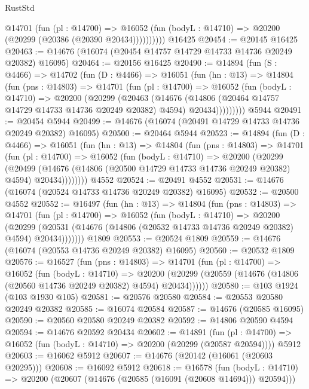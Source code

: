 \begin{lexlean}{RustStd}
\begin{coremodule}
            @14701
              (fun (pl : @14700) =>
              @16052 (fun (bodyL : @14710) => @20200 (@20299 (@20386 (@20390 @20434))))))))))
    @16425
@20454 := @20145 @16425
@20463 := @14676 (@16074 (@20454 @14757 @14729 @14733 @14736 @20249 @20382) @16095)
@20464 := @20156 @16425
@20490 := @14894
    (fun (S : @4466) =>
    @14702
      (fun (D : @4466) =>
      @16051
        (fun (hn : @13) =>
        @14804
          (fun (pns : @14803) =>
          @14701
            (fun (pl : @14700) =>
            @16052
              (fun (bodyL : @14710) =>
              @20200
                (@20299
                  (@20463
                    (@14676
                      (@14806 (@20464 @14757 @14729 @14733 @14736 @20249 @20382) @4594)
                      @20434)))))))))
    @5944
@20491 := @20454 @5944
@20499 := @14676 (@16074 (@20491 @14729 @14733 @14736 @20249 @20382) @16095)
@20500 := @20464 @5944
@20523 := @14894
    (fun (D : @4466) =>
    @16051
      (fun (hn : @13) =>
      @14804
        (fun (pns : @14803) =>
        @14701
          (fun (pl : @14700) =>
          @16052
            (fun (bodyL : @14710) =>
            @20200
              (@20299
                (@20499
                  (@14676 (@14806 (@20500 @14729 @14733 @14736 @20249 @20382) @4594) @20434))))))))
    @4552
@20524 := @20491 @4552
@20531 := @14676 (@16074 (@20524 @14733 @14736 @20249 @20382) @16095)
@20532 := @20500 @4552
@20552 := @16497
    (fun (hn : @13) =>
    @14804
      (fun (pns : @14803) =>
      @14701
        (fun (pl : @14700) =>
        @16052
          (fun (bodyL : @14710) =>
          @20200
            (@20299
              (@20531 (@14676 (@14806 (@20532 @14733 @14736 @20249 @20382) @4594) @20434)))))))
    @1809
@20553 := @20524 @1809
@20559 := @14676 (@16074 (@20553 @14736 @20249 @20382) @16095)
@20560 := @20532 @1809
@20576 := @16527
    (fun (pns : @14803) =>
    @14701
      (fun (pl : @14700) =>
      @16052
        (fun (bodyL : @14710) =>
        @20200 (@20299 (@20559 (@14676 (@14806 (@20560 @14736 @20249 @20382) @4594) @20434))))))
@20580 := @103 @1924 (@103 @1930 @105)
@20581 := @20576 @20580
@20584 := @20553 @20580 @20249 @20382
@20585 := @16074 @20584
@20587 := @14676 (@20585 @16095)
@20590 := @20560 @20580 @20249 @20382
@20592 := @14806 @20590 @4594
@20594 := @14676 @20592 @20434
@20602 := @14891
    (fun (pl : @14700) => @16052 (fun (bodyL : @14710) => @20200 (@20299 (@20587 @20594))))
    @5912
@20603 := @16062 @5912
@20607 := @14676 (@20142 (@16061 (@20603 @20295)))
@20608 := @16092 @5912
@20618 := @16578
    (fun (bodyL : @14710) => @20200 (@20607 (@14676 (@20585 (@16091 (@20608 @14694))) @20594)))

\end{coremodule}
\end{lexlean}
